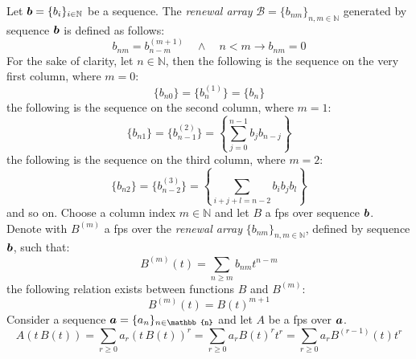 Let $\boldsymbol{b}=\lbrace b_{i}\rbrace_{i\in\mathbb{N}}$ be a sequence. 
The \emph{renewal array} 
$\mathcal{B}=\lbrace b_{nm}\rbrace_{n,m\in\mathbb{N}}$
generated by sequence $\boldsymbol{b}$ is defined as follows:
\begin{displaymath}
    b_{nm}=b_{n-m}^{(m+1)} \quad\wedge\quad n < m\rightarrow b_{nm}=0
\end{displaymath}
For the sake of clarity, let $n\in\mathbb{N}$, then
the following is the sequence on the very first column, where $m=0$:
\begin{displaymath}
    \lbrace b_{n0}\rbrace
        =\lbrace b_{n}^{(1)}\rbrace
        =\lbrace b_{n}\rbrace
\end{displaymath}
the following is the sequence on the second column, where $m=1$:
\begin{displaymath}
    \lbrace b_{n1}\rbrace
        =\lbrace b_{n-1}^{(2)}\rbrace
        =\left\lbrace \sum_{j=0}^{n-1}{b_{j}b_{n-j}}\right\rbrace
\end{displaymath}
the following is the sequence on the third column, where $m=2$:
\begin{displaymath}
    \lbrace b_{n2}\rbrace
        =\lbrace b_{n-2}^{(3)}\rbrace
        =\left\lbrace \sum_{i+j+l=n-2}{b_{i}b_{j}b_{l}}\right\rbrace
\end{displaymath}
and so on. Choose a column index $m\in\mathbb{N}$ and 
let $B$ a \ac{fps} over sequence $\boldsymbol{b}$.
Denote with $B^{(m)}$ a \ac{fps} over the \emph{renewal array} 
$\lbrace b_{nm} \rbrace_{n,m\in\mathbb{N}}$, defined by sequence $\boldsymbol{b}$, 
such that:
\begin{displaymath}
    B^{(m)}(t) = \sum_{n\geq m}{b_{nm}t^{n-m}}
\end{displaymath}
the following relation exists between functions $B$ and $B^{(m)}$:
\begin{displaymath}
    B^{(m)}(t) = B(t)^{m+1}
\end{displaymath}
Consider a sequence
$\vect{a}=\lbrace a_{n} \rbrace_{n\in\mathbb{n}}$ and let $A$ be
a \ac{fps} over $\boldsymbol{a}$.
\begin{displaymath}
    A\left(t\,B(t)\right) 
        = \sum_{r\geq 0}{a_{r}\left(t\,B(t)\right)^{r}}
        = \sum_{r\geq 0}{a_{r}B(t)^{r}t^{r}}
        = \sum_{r\geq 0}{a_{r}B^{(r-1)}(t)t^{r}}
\end{displaymath}
